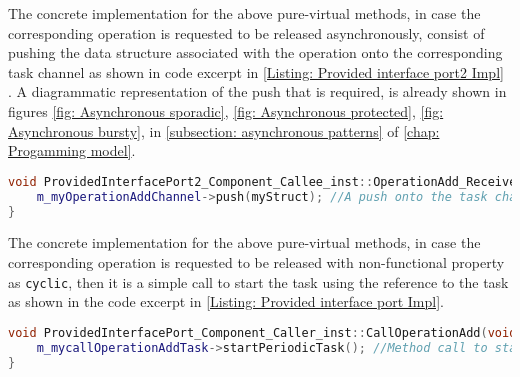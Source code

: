 The concrete implementation for the above pure-virtual methods, in case the corresponding operation is requested to be released asynchronously, consist of pushing the data structure associated with the operation onto the corresponding task channel as shown in code excerpt in \cref{Listing: Provided interface port2 Impl} . A diagrammatic representation of the push that is required, is already shown in figures \cref{fig: Asynchronous sporadic}, \cref{fig: Asynchronous protected}, \cref{fig: Asynchronous bursty}, in \cref{subsection: asynchronous patterns} of \cref{chap: Progamming model}.

\begin{Listing}
\begin{lstlisting}[language=C++]
void ProvidedInterfacePort2_Component_Callee_inst::OperationAdd_Receiver (General::OperationAddStruct_InterfaceB myStruct) {
	m_myOperationAddChannel->push(myStruct); //A push onto the task channel
}
\end{lstlisting}
\caption{Code excerpt from the generated code for operation \texttt{OperationAdd} access in \texttt{Provided\allowbreak Interface\allowbreak Port2\_\allowbreak Component\_\allowbreak Callee\_\allowbreak inst} which is called asynchronously}
\label{Listing: Provided interface port2 Impl}
\end{Listing}

The concrete implementation for the above pure-virtual methods, in case the corresponding operation is requested to be released with non-functional property as \texttt{cyclic}, then it is a simple call to start the task using the reference to the task as shown in the code excerpt in \cref{Listing: Provided interface port Impl}.

\begin{Listing}
\begin{lstlisting}[language=C++]
void ProvidedInterfacePort_Component_Caller_inst::CallOperationAdd(void) {
	m_mycallOperationAddTask->startPeriodicTask(); //Method call to start the task
}
\end{lstlisting}
\caption{Code excerpt from the generated code for operation \texttt{CallOperationAdd} in \texttt{Provided\allowbreak Interface\allowbreak Port\_\allowbreak Component\_\allowbreak Caller\_\allowbreak inst} which has non-functional property set as \texttt{Cyclic}}
\label{Listing: Provided interface port Impl}
\end{Listing}

